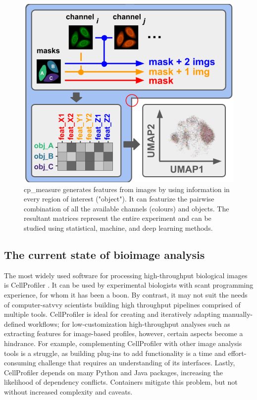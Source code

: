 \documentclass{article}
\begin{document}
\begin{figure}[htbp]
\centering
\includegraphics[width=.99\linewidth]{./figs/fig_1_tmp.png}
\caption{\label{fig:overview}cp\_measure generates features from images by using information in every region of interest ("object"). It can featurize the pairwise combination of all the available channels (colours) and objects. The resultant matrices represent the entire experiment and can be studied using statistical, machine, and deep learning methods.}
\end{figure}

\subsection{The current state of bioimage analysis}
\label{sec:org8f5b33d}
The most widely used software for processing high-throughput biological images is CellProfiler \citep{stirlingCellProfiler4Improvements2021}. It can be used by experimental biologists with scant programming experience, for whom it has been a boon. By contrast, it may not suit the needs of computer-satvvy scientists building high throughput pipelines comprised of multiple tools. CellProfiler is ideal for creating and iteratively adapting manually-defined workflows; for low-customization high-throughput analyses such as extracting features for image-based profiles, however, certain aspects become a hindrance. For example, complementing CellProfiler with other image analysis tools is a struggle, as building plug-ins to add functionality is a time and effort-consuming challenge that requires an understanding of its interfaces. Lastly, CellProfiler depends on many Python and Java packages, increasing the likelihood of dependency conflicts. Containers mitigate this problem, but not without increased complexity and caveats.
\end{document}
